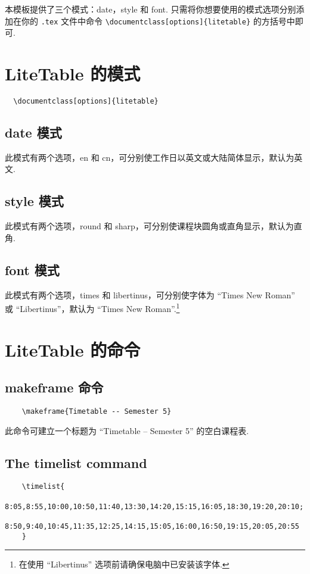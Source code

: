 \documentclass[11pt]{article}
\def\pkg#1{\texorpdfstring{\textcolor{pkgcolor}{\textsf{#1}}}{“#1”}}
\def\mode#1{\texorpdfstring{\textcolor{moducolor}{\textsf{#1}}}{“#1”}}
\def\cmd#1{\texorpdfstring{\textcolor{cmdcolor}{\textsf{#1}}}{“#1”}}
\begin{document}
本模板提供了三个模式：\mode{date}，\mode{style} 和 \mode{font}. 只需将你想要使用的模式选项分别添加在你的 \verb|.tex| 文件中命令 \verb|\documentclass[options]{litetable}| 的方括号中即可.

\newpage
\section{\pkg{LiteTable} 的模式}
\begin{verbatim}
  \documentclass[options]{litetable}
\end{verbatim}
\subsection{\mode{date} 模式}
此模式有两个选项，\mode{en} 和 \mode{cn}，可分别使工作日以英文或大陆简体显示，默认为英文.

\subsection{\mode{style} 模式}
此模式有两个选项，\mode{round} 和 \mode{sharp}，可分别使课程块圆角或直角显示，默认为直角.

\subsection{\mode{font} 模式}
此模式有两个选项，\mode{times} 和 \mode{libertinus}，可分别使字体为 ``Times New Roman'' 或 ``Libertinus''，默认为 ``Times New Roman''.\footnote{在使用 ``Libertinus'' 选项前请确保电脑中已安装该字体.}

\section{\pkg{LiteTable} 的命令}

\subsection{\cmd{makeframe} 命令}
\begin{verbatim}
    \makeframe{Timetable -- Semester 5}
\end{verbatim}

此命令可建立一个标题为 ``Timetable -- Semester 5'' 的空白课程表.

\subsection{The \cmd{timelist} command}
\begin{verbatim}
    \timelist{
      8:05,8:55,10:00,10:50,11:40,13:30,14:20,15:15,16:05,18:30,19:20,20:10;
      8:50,9:40,10:45,11:35,12:25,14:15,15:05,16:00,16:50,19:15,20:05,20:55
    }
\end{verbatim}
\end{document}
